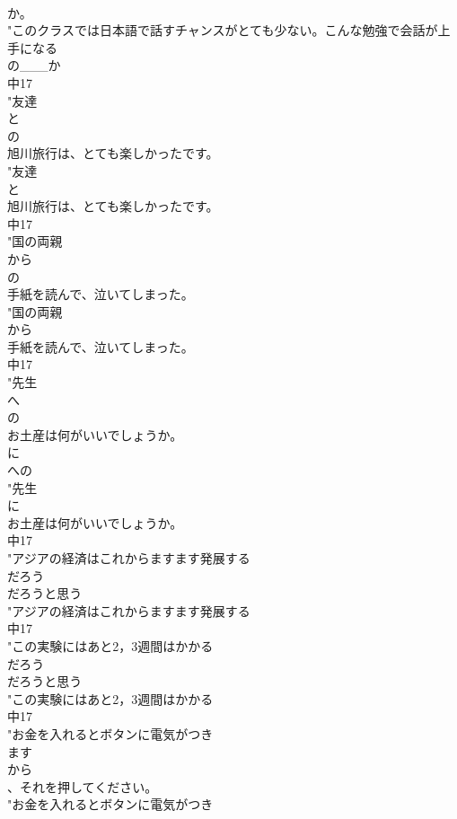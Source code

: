 \documentclass[8pt]{extreport}
\begin{document}
\begin{CJK}{UTF8}{min}
\\	か。
\\	"このクラスでは日本語で話すチャンスがとても少ない。こんな勉強で会話が上手になる
\\	の___か
\\	中17
\\	"友達
\\	と
\\	の
\\	旭川旅行は、とても楽しかったです。
\\	"友達
\\	と
\\	旭川旅行は、とても楽しかったです。
\\	中17
\\	"国の両親
\\	から
\\	の
\\	手紙を読んで、泣いてしまった。
\\	"国の両親
\\	から
\\	手紙を読んで、泣いてしまった。
\\	中17
\\	"先生
\\	へ
\\	の
\\	お土産は何がいいでしょうか。 
\\	に
\\	への
\\	"先生
\\	に
\\	お土産は何がいいでしょうか。
\\	中17
\\	"アジアの経済はこれからますます発展する
\\	だろう
\\	だろうと思う
\\	"アジアの経済はこれからますます発展する
\\	中17
\\	"この実験にはあと2，3週間はかかる
\\	だろう
\\	だろうと思う
\\	"この実験にはあと2，3週間はかかる
\\	中17
\\	"お金を入れるとボタンに電気がつき
\\	ます
\\	から
\\	、それを押してください。
\\	"お金を入れるとボタンに電気がつき

\end{CJK}
\end{document}
